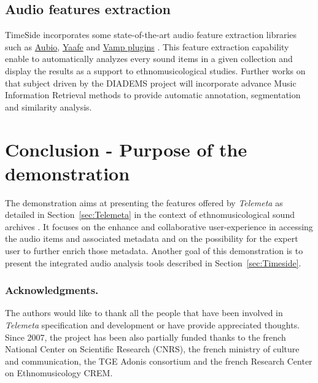 \documentclass[runningheads,a4paper]{llncs}
\begin{document}
\subsection{Audio features extraction}
TimeSide incorporates some state-of-the-art audio feature extraction libraries such as \href{http://aubio.org}{Aubio}, \href{http://yaafe.sourceforge.net}{Yaafe} and \href{http://www.vamp-plugins.org}{Vamp plugins} \cite{brossierPhD,yaafe_ISMIR2010,vamp-plugins}.
This feature extraction capability enable to automatically analyzes every sound items in a given collection and display the results as a support to ethnomusicological studies.
Further works on that subject driven by the DIADEMS project will incorporate advance Music Information Retrieval methods to provide automatic annotation, segmentation and similarity analysis.

\section{Conclusion - Purpose of the demonstration}\vspace{-0.2cm}
The demonstration aims at presenting the features offered by \emph{Telemeta} as detailed in Section~\ref{sec:Telemeta} in the context of ethnomusicological sound archives \cite{telemetaCREM}. It focuses on the enhance and collaborative user-experience in accessing the audio items and associated metadata and on the possibility for the expert user to further enrich those metadata.
Another goal of this demonstration is to present the integrated audio analysis tools described in Section~\ref{sec:Timeside}.

\vspace{-0.2cm}
\subsubsection*{Acknowledgments.} 
The authors would like to thank all the people that have been involved in \emph{Telemeta} specification and development or have provide appreciated thoughts. Since 2007, the project has been also partially funded thanks to the french National Center on Scientific Research (CNRS), the french ministry of culture and communication, the TGE Adonis consortium and the french Research Center on Ethnomusicology CREM.




\end{document}
